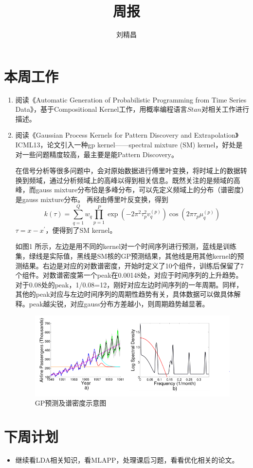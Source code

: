 \documentclass{ctexart}
\begin{document}
\title{周报}
\author{刘精昌}
\maketitle

\fangsong
\section*{本周工作}
\begin{enumerate}
  \item 阅读《Automatic Generation of Probabilistic Programming from Time Series Data》，基于Compositional Kernel工作，用概率编程语言$Stan$对相关工作进行描述。
  \item 阅读《Gaussian Process Kernels for Pattern Discovery and Extrapolation》ICML13，论文引入一种gp kernel——spectral mixture (SM) kernel，好处是对一些问题精度较高，最主要是能Pattern Discovery。

      在信号分析等很多问题中，会对原始数据进行傅里叶变换，将时域上的数据转换到频域，通过分析频域上的高峰以得到相关信息。既然关注的是频域的高峰，而gauss mixture分布恰是多峰分布，可以先定义频域上的分布（谱密度）是gauss mixture分布。
      再经由傅里叶反变换，得到\[k\left( \tau  \right) = \sum\limits_{q = 1}^Q {{w_q}\prod\limits_{p = 1}^P {\exp \left( { - 2{\pi ^2}\tau _p^2v_q^{\left( p \right)}} \right)\cos \left( {2\pi {\tau _p}\mu _q^{\left( p \right)}} \right)} }\]
      $\tau  = x - x^{'} $，便得到了SM kernel。

      如图1 所示，左边是用不同的kernel对一个时间序列进行预测，蓝线是训练集，绿线是实际值，黑线是SM核的GP预测结果，其他线是用其他kernel的预测结果。右边是对应的对数谱密度，开始时定义了10个组件，训练后保留了7个组件。对数谱密度第一个peak在0.00148处，对应于时间序列的上升趋势。对于0.08处的peak，1/0.08=12，刚好对应左边时间序列的一年周期。同样，其他的peak对应与左边时间序列的周期性趋势有关，具体数据可以做具体解释。peak越尖锐，对应gauss分布方差越小，则周期趋势越显著。
    \begin{figure}
      \centering
      \includegraphics[width=\textwidth]{1.png}
      \caption{GP预测及谱密度示意图}\label{1}
    \end{figure}

\end{enumerate}

\section*{下周计划}
\begin{itemize}
  \item 继续看LDA相关知识，看MLAPP，处理课后习题，看看优化相关的论文。
\end{itemize}
\end{document}
